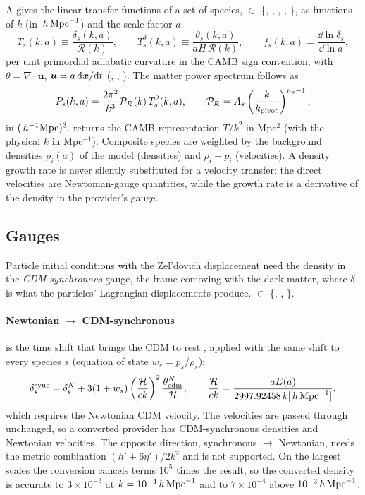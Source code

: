 A  gives the linear transfer functions of a set of species,
 $\in$ \{, , , , \}, as
functions of $k$ (in $\,h\,\mathrm{Mpc}^{-1}$) and the scale factor $a$:
\begin{equation}
T_s(k,a)\equiv\frac{\delta_s(k,a)}{\mathcal R(k)},\qquad
T^\theta_s(k,a)\equiv\frac{\theta_s(k,a)}{aH\,\mathcal R(k)},\qquad
f_s(k,a)=\frac{\dd\ln\delta_s}{\dd\ln a},
\end{equation}
per unit primordial adiabatic curvature in the CAMB sign convention, with $\theta=\nabla\cdot\bm u$, $\bm u=a\,\mathrm{d}\bm{x}/\mathrm{d} t$
(, , ). The matter power
spectrum follows as
\begin{equation}
P_s(k,a)=\frac{2\pi^2}{k^3}\mathcal P_\mathcal R(k)\,T_s^2(k,a),\qquad
\mathcal P_\mathcal R=A_s\left(\frac{k}{k_{\rm pivot}}\right)^{n_s-1},
\end{equation}
in $(\,h^{-1}\mathrm{Mpc})^3$.  returns the CAMB representation $T/k^2$ in Mpc$^2$ (with the physical $k$ in
Mpc$^{-1}$). Composite species are weighted by the background densities $\rho_i(a)$ of the model (densities) and
$\rho_i+p_i$ (velocities). A density growth rate is never silently substituted for a velocity transfer: the direct
velocities are Newtonian-gauge quantities, while the growth rate is a derivative of the density in the provider's
gauge.

\subsection{Gauges}\label{sec:transfer-gauges}

Particle initial conditions with the Zel'dovich displacement need the density in the \emph{CDM-synchronous} gauge,
the frame comoving with the dark matter, where $\delta$ is what the particles' Lagrangian displacements produce.
 $\in$ \{, , \}.

\paragraph*{Newtonian $\to$ CDM-synchronous} is the time shift that brings the CDM to rest
\cite{Ma1995}, applied with the same shift to every species $s$ (equation of state $w_s=p_s/\rho_s$):
\begin{equation}
\delta_s^{\rm sync}=\delta_s^N+3(1+w_s)\left(\frac{\mathcal{H}}{ck}\right)^2\frac{\theta_{\rm cdm}^N}{\mathcal{H}},\qquad
\frac{\mathcal{H}}{ck}=\frac{aE(a)}{2997.92458\,k[\,h\,\mathrm{Mpc}^{-1}]},
\end{equation}
which requires the Newtonian CDM velocity. The velocities are passed through unchanged, so a converted provider has
CDM-synchronous densities and Newtonian velocities. The opposite direction, synchronous $\to$ Newtonian, needs the
metric combination $(h'+6\eta')/2k^2$ and is not supported. On the largest scales the conversion cancels terms $10^5$
times the result, so the converted density is accurate to $3\times10^{-3}$ at $k=10^{-4}\,h\,\mathrm{Mpc}^{-1}$ and to $7\times10^{-4}$
above $10^{-3}\,h\,\mathrm{Mpc}^{-1}$.

